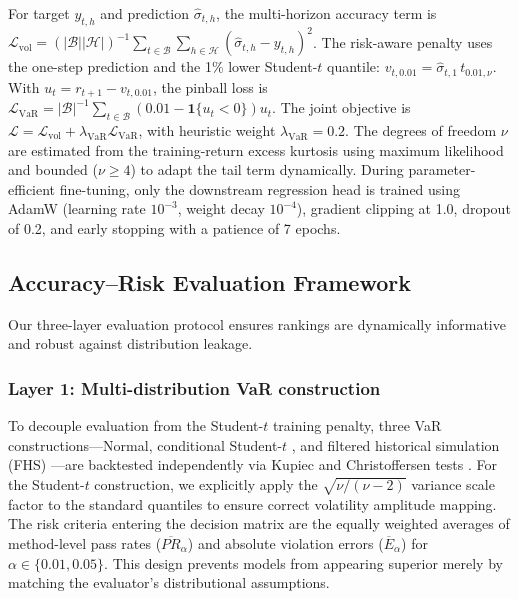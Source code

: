 \documentclass[runningheads]{llncs}
\begin{document}
For target \(y_{t,h}\) and prediction \(\hat{\sigma}_{t,h}\), the multi-horizon accuracy term is \(\mathcal{L}_{\mathrm{vol}} = (|\mathcal{B}||\mathcal{H}|)^{-1} \sum_{t\in\mathcal{B}}\sum_{h\in\mathcal{H}} (\hat{\sigma}_{t,h}-y_{t,h})^2\).
The risk-aware penalty uses the one-step prediction and the 1\% lower Student-\(t\) quantile: \(v_{t,0.01}=\hat{\sigma}_{t,1}\,t_{0.01,\nu}\). With \(u_t=r_{t+1}-v_{t,0.01}\), the pinball loss \cite{koenker1978} is \(\mathcal{L}_{\mathrm{VaR}} = |\mathcal{B}|^{-1}\sum_{t\in\mathcal{B}} (0.01-\mathbf{1}\{u_t<0\})u_t\).
The joint objective is \(\mathcal{L} = \mathcal{L}_{\mathrm{vol}} + \lambda_{\mathrm{VaR}}\mathcal{L}_{\mathrm{VaR}}\), with heuristic weight \(\lambda_{\mathrm{VaR}}=0.2\). The degrees of freedom \(\nu\) are estimated from the training-return excess kurtosis using maximum likelihood and bounded (\(\nu \ge 4\)) to adapt the tail term dynamically. During parameter-efficient fine-tuning, only the downstream regression head is trained using AdamW (learning rate \(10^{-3}\), weight decay \(10^{-4}\)), gradient clipping at 1.0, dropout of 0.2, and early stopping with a patience of 7 epochs.

\subsection{Accuracy--Risk Evaluation Framework}

Our three-layer evaluation protocol ensures rankings are dynamically informative and robust against distribution leakage.

\subsubsection{Layer 1: Multi-distribution VaR construction}
To decouple evaluation from the Student-\(t\) training penalty, three VaR constructions---Normal, conditional Student-\(t\) \cite{bollerslev1987}, and filtered historical simulation (FHS) \cite{baroneadesi1999}---are backtested independently via Kupiec and Christoffersen tests \cite{kupiec1995,christoffersen1998}. For the Student-\(t\) construction, we explicitly apply the \(\sqrt{\nu/(\nu-2)}\) variance scale factor to the standard quantiles to ensure correct volatility amplitude mapping. The risk criteria entering the decision matrix are the equally weighted averages of method-level pass rates (\(\overline{PR}_{\alpha}\)) and absolute violation errors (\(\overline{E}_{\alpha}\)) for \(\alpha\in\{0.01,0.05\}\). This design prevents models from appearing superior merely by matching the evaluator's distributional assumptions.
\end{document}
